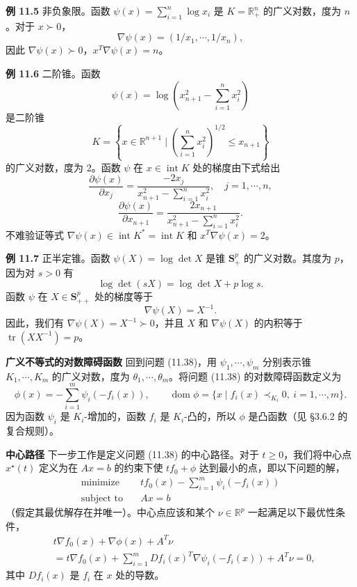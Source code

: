 \documentclass[UTF8, 12pt, fontset=fandol, oneside]{ctexart}
\begin{document}
\noindent\textbf{例 11.5}\quad
非负象限。函数 $\psi(x)=\sum_{i=1}^n\log x_i$ 是 $K=\mathbb{R}_+^n$ 的广义对数，度为 $n$。对于 $x\succ 0$，
\[
\nabla\psi(x)=(1/x_1,\cdots,1/x_n),
\]
因此 $\nabla\psi(x)\succ 0$，$x^T\nabla\psi(x)=n$。

\noindent\textbf{例 11.6}\quad
二阶锥。函数
\[
\psi(x)=\log\left(x_{n+1}^2-\sum_{i=1}^n x_i^2\right)
\]
是二阶锥
\[
K=\left\{x\in\mathbb{R}^{n+1}\mid \left(\sum_{i=1}^n x_i^2\right)^{1/2}\leq x_{n+1}\right\}
\]
的广义对数，度为 2。函数 $\psi$ 在 $x\in\operatorname{int}K$ 处的梯度由下式给出
\[
\frac{\partial\psi(x)}{\partial x_j}=
\frac{-2x_j}{x_{n+1}^2-\sum_{i=1}^n x_i^2},\quad j=1,\cdots,n,
\]
\[
\frac{\partial\psi(x)}{\partial x_{n+1}}=
\frac{2x_{n+1}}{x_{n+1}^2-\sum_{i=1}^n x_i^2}.
\]
不难验证等式 $\nabla\psi(x)\in\operatorname{int}K^\ast=\operatorname{int}K$ 和 $x^T\nabla\psi(x)=2$。

\noindent\textbf{例 11.7}\quad
正半定锥。函数 $\psi(X)=\log\det X$ 是锥 $\mathbf{S}_+^p$ 的广义对数。其度为 $p$，因为对 $s>0$ 有
\[
\log\det(sX)=\log\det X+p\log s.
\]
函数 $\psi$ 在 $X\in\mathbf{S}_{++}^p$ 处的梯度等于
\[
\nabla\psi(X)=X^{-1}.
\]
因此，我们有 $\nabla\psi(X)=X^{-1}\succ 0$，并且 $X$ 和 $\nabla\psi(X)$ 的内积等于 $\operatorname{tr}(XX^{-1})=p$。

\noindent\textbf{广义不等式的对数障碍函数}\quad
回到问题 (11.38)，用 $\psi_1,\cdots,\psi_m$ 分别表示锥 $K_1,\cdots,K_m$ 的广义对数，度为 $\theta_1,\cdots,\theta_m$。将问题 (11.38) 的对数障碍函数定义为
\[
\phi(x)=-\sum_{i=1}^m\psi_i(-f_i(x)),\qquad
\operatorname{dom}\phi=\{x\mid f_i(x)\prec_{K_i}0,\ i=1,\cdots,m\}.
\]
因为函数 $\psi_i$ 是 $K_i$-增加的，函数 $f_i$ 是 $K_i$-凸的，所以 $\phi$ 是凸函数（见 \S3.6.2 的复合规则）。

\noindent\textbf{中心路径}\quad
下一步工作是定义问题 (11.38) 的中心路径。对于 $t\geq 0$，我们将中心点 $x^\star(t)$ 定义为在 $Ax=b$ 的约束下使 $tf_0+\phi$ 达到最小的点，即以下问题的解，
\[
\begin{aligned}
\text{minimize}\quad & tf_0(x)-\sum_{i=1}^m\psi_i(-f_i(x))\\
\text{subject to}\quad & Ax=b
\end{aligned}
\]
（假定其最优解存在并唯一）。中心点应该和某个 $\nu\in\mathbb{R}^p$ 一起满足以下最优性条件，
\begin{equation}
\begin{aligned}
&t\nabla f_0(x)+\nabla\phi(x)+A^T\nu\\
&=t\nabla f_0(x)+\sum_{i=1}^m Df_i(x)^T\nabla\psi_i(-f_i(x))+A^T\nu=0,
\end{aligned}
\tag{11.41}
\end{equation}
其中 $Df_i(x)$ 是 $f_i$ 在 $x$ 处的导数。
\end{document}

